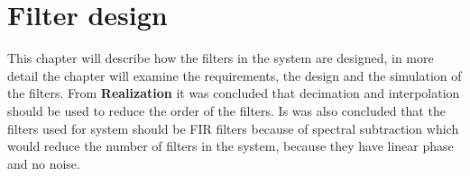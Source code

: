 \chapter{Filter design}
This chapter will describe how the filters in the system are designed, in more detail the chapter will examine the requirements, the design and the simulation of the filters. From \textbf{Realization} it was concluded that decimation and interpolation should be used to reduce the order of the filters.  
Is was also concluded that the filters used for system should be FIR filters because of spectral subtraction which would reduce the number of filters in the system, because they have linear phase and no noise.
   






%

%